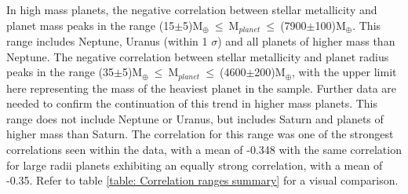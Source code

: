 \documentclass[a4paper,twocolumn,12pt]{article}
\begin{document}
In high mass planets, the negative correlation between stellar metallicity and planet mass peaks in the range (15$\pm$5)M$_{\oplus}~\leq~$M$_{planet}~\leq~$(7900$\pm$100)M$_{\oplus}$. This range includes Neptune, Uranus (within 1 $\sigma$) and all planets of higher mass than Neptune. The negative correlation between stellar metallicity and planet radius peaks in the range (35$\pm$5)M$_{\oplus}~\leq~$M$_{planet}~\leq~$(4600$\pm$200)M$_{\oplus}$, with the upper limit here representing the mass of the heaviest planet in the sample. Further data are needed to confirm the continuation of this trend in higher mass planets. This range does not include Neptune or Uranus, but includes Saturn and planets of higher mass than Saturn. The correlation for this range was one of the strongest correlations seen within the data, with a mean of -0.348 with the same correlation for large radii planets exhibiting an equally strong correlation, with a mean of -0.35. Refer to table \ref{table: Correlation ranges summary} for a visual comparison.
\end{document}
